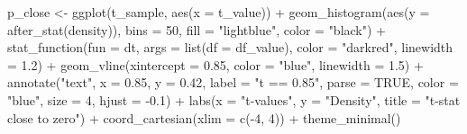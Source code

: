 \documentclass[
  letterpaper,
  DIV=11,
  numbers=noendperiod]{scrreprt}
\newenvironment{Shaded}{\begin{snugshade}}{\end{snugshade}}
\newcommand{\AttributeTok}[1]{\textcolor[rgb]{0.40,0.45,0.13}{#1}}
\newcommand{\ConstantTok}[1]{\textcolor[rgb]{0.56,0.35,0.01}{#1}}
\newcommand{\DecValTok}[1]{\textcolor[rgb]{0.68,0.00,0.00}{#1}}
\newcommand{\FloatTok}[1]{\textcolor[rgb]{0.68,0.00,0.00}{#1}}
\newcommand{\FunctionTok}[1]{\textcolor[rgb]{0.28,0.35,0.67}{#1}}
\newcommand{\NormalTok}[1]{\textcolor[rgb]{0.00,0.23,0.31}{#1}}
\newcommand{\OtherTok}[1]{\textcolor[rgb]{0.00,0.23,0.31}{#1}}
\newcommand{\SpecialCharTok}[1]{\textcolor[rgb]{0.37,0.37,0.37}{#1}}
\newcommand{\StringTok}[1]{\textcolor[rgb]{0.13,0.47,0.30}{#1}}
\begin{document}
\begin{Shaded}
\begin{Highlighting}[]
\NormalTok{p\_close }\OtherTok{\textless{}{-}} \FunctionTok{ggplot}\NormalTok{(t\_sample, }\FunctionTok{aes}\NormalTok{(}\AttributeTok{x =}\NormalTok{ t\_value)) }\SpecialCharTok{+}
  \FunctionTok{geom\_histogram}\NormalTok{(}\FunctionTok{aes}\NormalTok{(}\AttributeTok{y =} \FunctionTok{after\_stat}\NormalTok{(density)),}
                 \AttributeTok{bins =} \DecValTok{50}\NormalTok{, }\AttributeTok{fill =} \StringTok{"lightblue"}\NormalTok{, }\AttributeTok{color =} \StringTok{"black"}\NormalTok{) }\SpecialCharTok{+}
  \FunctionTok{stat\_function}\NormalTok{(}\AttributeTok{fun =}\NormalTok{ dt, }\AttributeTok{args =} \FunctionTok{list}\NormalTok{(}\AttributeTok{df =}\NormalTok{ df\_value),}
                \AttributeTok{color =} \StringTok{"darkred"}\NormalTok{, }\AttributeTok{linewidth =} \FloatTok{1.2}\NormalTok{) }\SpecialCharTok{+}
  \FunctionTok{geom\_vline}\NormalTok{(}\AttributeTok{xintercept =} \FloatTok{0.85}\NormalTok{, }\AttributeTok{color =} \StringTok{"blue"}\NormalTok{, }\AttributeTok{linewidth =} \FloatTok{1.5}\NormalTok{) }\SpecialCharTok{+}
  \FunctionTok{annotate}\NormalTok{(}\StringTok{"text"}\NormalTok{, }\AttributeTok{x =} \FloatTok{0.85}\NormalTok{, }\AttributeTok{y =} \FloatTok{0.42}\NormalTok{, }\AttributeTok{label =} \StringTok{"t == 0.85"}\NormalTok{,}
           \AttributeTok{parse =} \ConstantTok{TRUE}\NormalTok{, }\AttributeTok{color =} \StringTok{"blue"}\NormalTok{, }\AttributeTok{size =} \DecValTok{4}\NormalTok{, }\AttributeTok{hjust =} \SpecialCharTok{{-}}\FloatTok{0.1}\NormalTok{) }\SpecialCharTok{+}
  \FunctionTok{labs}\NormalTok{(}\AttributeTok{x =} \StringTok{"t{-}values"}\NormalTok{, }\AttributeTok{y =} \StringTok{"Density"}\NormalTok{, }
       \AttributeTok{title =} \StringTok{"t{-}stat close to zero"}\NormalTok{) }\SpecialCharTok{+}
  \FunctionTok{coord\_cartesian}\NormalTok{(}\AttributeTok{xlim =} \FunctionTok{c}\NormalTok{(}\SpecialCharTok{{-}}\DecValTok{4}\NormalTok{, }\DecValTok{4}\NormalTok{)) }\SpecialCharTok{+}
  \FunctionTok{theme\_minimal}\NormalTok{()}


\end{Highlighting}
\end{Shaded}
\end{document}

